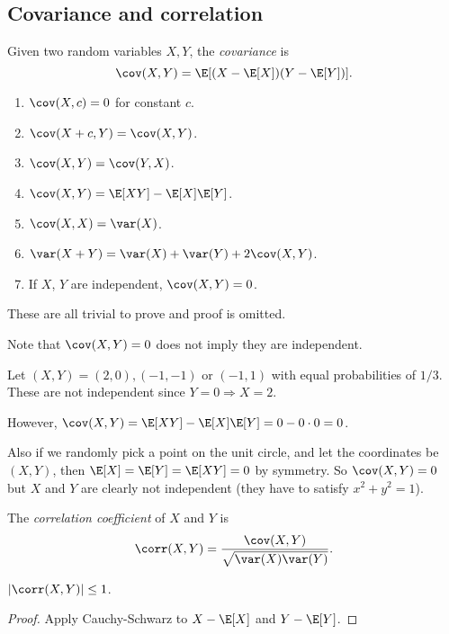 \documentclass[a4paper]{article}
\begin{document}
\subsection{Covariance and correlation}
\begin{defi}[Covariance]
  Given two random variables $X, Y$, the \emph{covariance} is
  \[
    \cov(X, Y) = \E[(X - \E[X])(Y - \E[Y])].
  \]
\end{defi}

\begin{prop}\leavevmode
  \begin{enumerate}
    \item $\cov(X, c) = 0$ for constant $c$.
    \item $\cov(X + c, Y) = \cov (X, Y)$.
    \item $\cov (X, Y) = \cov (Y, X)$.
    \item $\cov (X, Y) = \E[XY] - \E[X]\E[Y]$.
    \item $\cov (X, X) = \var (X)$.
    \item $\var (X + Y) = \var (X) + \var (Y) + 2\cov (X, Y)$.
    \item If $X$, $Y$ are independent, $\cov(X, Y) = 0$.
  \end{enumerate}
\end{prop}
These are all trivial to prove and proof is omitted.

Note that $\cov(X, Y) = 0$ does not imply they are independent.
\begin{eg}
  Let $(X, Y) = (2, 0), (-1, -1)$ or $(-1, 1)$ with equal probabilities of $1/3$. These are not independent since $Y = 0\Rightarrow X = 2$.

  However, $\cov (X, Y) = \E[XY] - \E[X]\E[Y] = 0 - 0\cdot 0 = 0$.

  Also if we randomly pick a point on the unit circle, and let the coordinates be $(X, Y)$, then $\E[X] = \E[Y] = \E[XY] = 0$ by symmetry. So $\cov(X, Y) = 0$ but $X$ and $Y$ are clearly not independent (they have to satisfy $x^2 + y^2 = 1$).
\end{eg}

\begin{defi}
  The \emph{correlation coefficient} of $X$ and $Y$ is
  \[
    \corr(X, Y) = \frac{\cov (X, Y)}{\sqrt{\var (X)\var (Y)}}.
  \]
\end{defi}
\begin{cor}
  $|\corr(X, Y)| \leq 1$.
\end{cor}

\begin{proof}
  Apply Cauchy-Schwarz to $X - \E[X]$ and $Y - \E[Y]$.
\end{proof}
\end{document}
